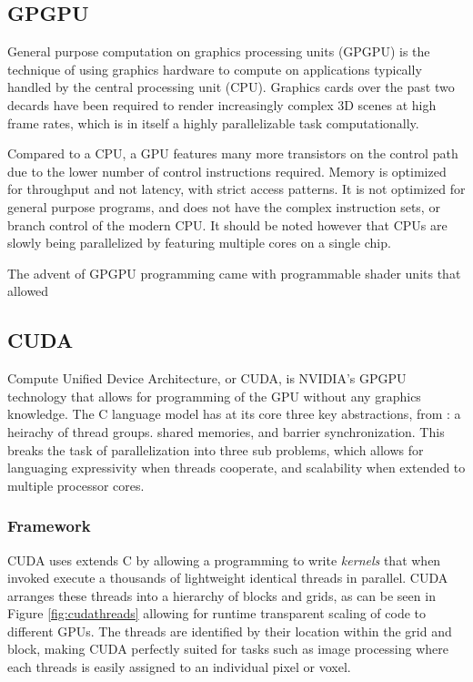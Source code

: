 	\subsection{GPGPU}
General purpose computation on graphics processing units (GPGPU) is the technique of using graphics hardware to compute on applications typically handled by the central processing unit (CPU). Graphics cards over the past two decards have been required to render increasingly complex 3D scenes at high frame rates, which is in itself a highly parallelizable task computationally. 

Compared to a CPU, a GPU features many more transistors on the control path due to the lower number of control instructions required. Memory is optimized for throughput and not latency, with strict access patterns. It is not optimized for general purpose programs, and does not have the complex instruction sets, or branch control of the modern CPU. It should be noted however that CPUs are slowly being parallelized by featuring multiple cores on a single chip.

The advent of GPGPU programming came with programmable shader units that allowed 

	\subsection{CUDA}
Compute Unified Device Architecture, or CUDA, is NVIDIA's GPGPU technology that allows for programming of the GPU without any graphics knowledge. The C language model has at its core three key abstractions, from \cite{cuda}: a heirachy of thread groups. shared memories, and barrier synchronization. This breaks the task of parallelization into three sub problems, which allows for languaging expressivity when threads cooperate, and scalability when extended to multiple processor cores.

		\subsubsection{Framework}
CUDA uses extends C by allowing a programming to write \textit{kernels} that when invoked execute a thousands of lightweight identical threads in parallel. CUDA arranges these threads into a hierarchy of blocks and grids, as can be seen in Figure \ref{fig:cudathreads} allowing for runtime transparent scaling of code to different GPUs. The threads are identified by their location within the grid and block, making CUDA perfectly suited for tasks such as image processing where each threads is easily assigned to an individual pixel or voxel.


